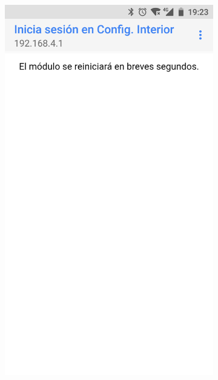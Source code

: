 \begin{figure}
\begin{subfigure}{0.49\columnwidth}
  \centering
  \includegraphics[width=1\columnwidth,frame]{images/interior-restart}
  \caption{}
  \label{fig:interior-restart}
\end{subfigure}
\hfill
\begin{subfigure}{0.49\columnwidth}
  \centering

\end{subfigure}
\end{figure}
